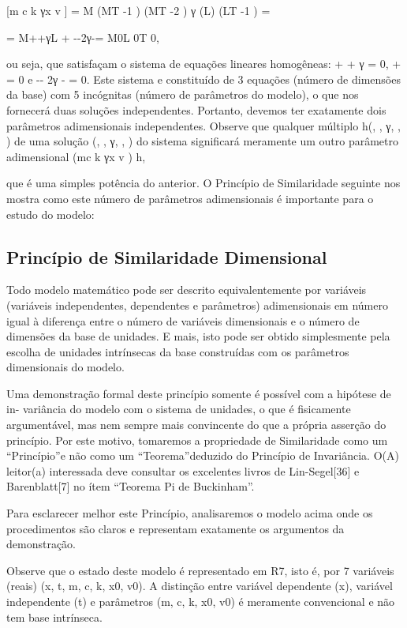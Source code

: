 [m\alpha
c
\beta
k
γx
v
] = M\alpha
(MT -1
)
\beta
(MT -2
)
γ
(L)
\delta
(LT -1
)
\lambda =

= M\alpha+\beta+γL
\delta+\lambdaT
-\beta-2γ-\lambda = M0L
0T
0,

ou seja, que satisfaçam o sistema de equações lineares homogêneas: \alpha + \beta + γ = 0, \delta + \lambda = 0 e -\beta - 2γ - \lambda = 0. Este sistema e constituído de 3 equações (número de dimensões da base) com 5 incógnitas (número de parâmetros do modelo), o que nos fornecerá duas soluções independentes. Portanto, devemos ter exatamente dois parâmetros adimensionais independentes. Observe que qualquer múltiplo h(\alpha, \beta, γ, \delta, \lambda) de uma solução (\alpha, \beta, γ, \delta, \lambda) do sistema significará meramente um outro parâmetro adimensional (m\alpha c \beta k γx
v
)
h,

que é uma simples potência do anterior. O Princípio de Similaridade seguinte nos mostra como este número de parâmetros adimensionais é importante para o estudo do modelo:

\subsection{Princípio de Similaridade Dimensional}

Todo modelo matemático pode ser descrito equivalentemente por variáveis (variáveis independentes, dependentes e parâmetros) adimensionais em número igual à diferença entre o número de variáveis dimensionais e o número de dimensões da base de unidades. E mais, isto pode ser obtido simplesmente pela escolha de unidades intrínsecas da base construídas com os parâmetros dimensionais do modelo.

Uma demonstração formal deste princípio somente é possível com a hipótese de in- variância do modelo com o sistema de unidades, o que é fisicamente argumentável, mas nem sempre mais convincente do que a própria asserção do princípio. Por este motivo, tomaremos a propriedade de Similaridade como um “Princípio”e não como um “Teorema”deduzido do Princípio de Invariância. O(A) leitor(a) interessada deve consultar os excelentes livros de Lin-Segel[36] e Barenblatt[7] no ítem “Teorema Pi de Buckinham”.

Para esclarecer melhor este Princípio, analisaremos o modelo acima onde os procedimentos são claros e representam exatamente os argumentos da demonstração.

Observe que o estado deste modelo é representado em R7, isto é, por 7 variáveis (reais) (x, t, m, c, k, x0, v0). A distinção entre variável dependente (x), variável independente (t) e parâmetros (m, c, k, x0, v0) é meramente convencional e não tem base intrínseca.


